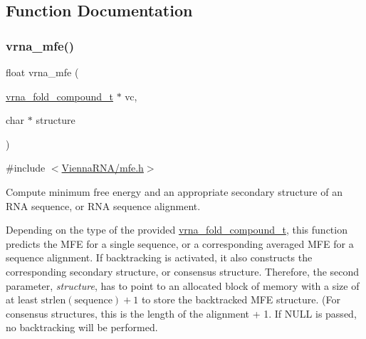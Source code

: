 \subsection{Function Documentation}
\mbox{\label{group__mfe__global_gabd3b147371ccf25c577f88bbbaf159fd}} 
\subsubsection{\texorpdfstring{vrna\+\_\+mfe()}{vrna\_mfe()}}
{\footnotesize\ttfamily float vrna\+\_\+mfe (\begin{DoxyParamCaption}\item[{\hyperlink{group__fold__compound_ga1b0cef17fd40466cef5968eaeeff6166}{vrna\+\_\+fold\+\_\+compound\+\_\+t} $\ast$}]{vc,  }\item[{char $\ast$}]{structure }\end{DoxyParamCaption})}



{\ttfamily \#include $<$\hyperlink{mfe_8h}{Vienna\+R\+N\+A/mfe.\+h}$>$}



Compute minimum free energy and an appropriate secondary structure of an R\+NA sequence, or R\+NA sequence alignment. 

Depending on the type of the provided \hyperlink{group__fold__compound_ga1b0cef17fd40466cef5968eaeeff6166}{vrna\+\_\+fold\+\_\+compound\+\_\+t}, this function predicts the M\+FE for a single sequence, or a corresponding averaged M\+FE for a sequence alignment. If backtracking is activated, it also constructs the corresponding secondary structure, or consensus structure. Therefore, the second parameter, {\itshape structure}, has to point to an allocated block of memory with a size of at least $\mathrm{strlen}(\mathrm{sequence})+1$ to store the backtracked M\+FE structure. (For consensus structures, this is the length of the alignment + 1. If {\ttfamily N\+U\+LL} is passed, no backtracking will be performed.

